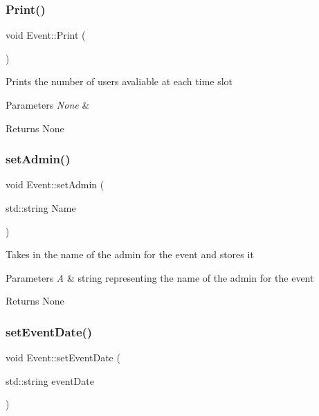 \subsubsection{\texorpdfstring{Print()}{Print()}}
{\footnotesize\ttfamily void Event\+::\+Print (\begin{DoxyParamCaption}{ }\end{DoxyParamCaption})}

Prints the number of users avaliable at each time slot 
\begin{DoxyParams}{Parameters}
{\em None} & \\
\hline
\end{DoxyParams}
\begin{DoxyReturn}{Returns}
None 
\end{DoxyReturn}
\mbox{\label{class_event_aec0fa6f68332424cdfb15855765cadf3}} 
\subsubsection{\texorpdfstring{set\+Admin()}{setAdmin()}}
{\footnotesize\ttfamily void Event\+::set\+Admin (\begin{DoxyParamCaption}\item[{std\+::string}]{Name }\end{DoxyParamCaption})}

Takes in the name of the admin for the event and stores it 
\begin{DoxyParams}{Parameters}
{\em A} & string representing the name of the admin for the event \\
\hline
\end{DoxyParams}
\begin{DoxyReturn}{Returns}
None 
\end{DoxyReturn}
\mbox{\label{class_event_a0fbbd58ef1341dfacea38de7795d3667}} 
\subsubsection{\texorpdfstring{set\+Event\+Date()}{setEventDate()}}
{\footnotesize\ttfamily void Event\+::set\+Event\+Date (\begin{DoxyParamCaption}\item[{std\+::string}]{event\+Date }\end{DoxyParamCaption})}

